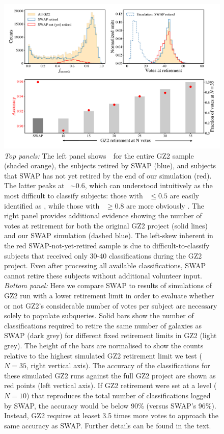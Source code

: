 \begin{figure}
\includegraphics[width=\linewidth]{Figures/human_machine/f6.pdf}
\caption[SWAP's intelligent retirement mechanism 3.5 times fewer classifications than GZ2.]{\textit{Top panels:} The left panel shows~\fsmooth~for the entire GZ2 sample (shaded orange), the subjects retired by SWAP (blue), and subjects that SWAP has not yet retired by the end of our simulation (red). The latter peaks at \fsmooth~$\sim 0.6$, which can understood intuitively as the most difficult to classify subjects: those with \fsmooth~$\le 0.5$ are easily identified as \feat, while those with \fsmooth~$\ge 0.8$ are more obviously \notfeat. The right panel provides additional evidence showing the number of votes at retirement for both the original GZ2 project (solid lines) and our SWAP simulation (dashed blue). The left-skew inherent in the red SWAP-not-yet-retired sample is due to difficult-to-classify subjects that received only 30-40 classifications during the GZ2 project. Even after processing all available classifications, SWAP cannot retire these subjects without additional volunteer input. 
\textit{Bottom panel:} Here we compare SWAP to results of simulations of GZ2 run with a lower retirement limit in order to evaluate whether or not GZ2's considerable number of votes per subject are necessary solely to populate subqueries. Solid bars show the number of classifications required to retire the same number of galaxies as SWAP (dark grey) for different fixed retirement limits in GZ2 (light grey). The height of the bars are normalised to show the counts relative to the highest simulated GZ2 retirement limit we test ($N=35$, right vertical axis).  The accuracy of the classifications for these simulated GZ2 runs against the full GZ2 project are shown as red points (left vertical axis). If GZ2 retirement were set at a level ($N=10$) that reproduces the total number of classifications logged by SWAP, the accuracy would be below 90\% (versus SWAP's 96\%).  Instead, GZ2 requires at leaset 3.5 times more votes to approach the same accuracy as SWAP. Further details can be found in the text.}
\label{fig: gz2 min retirement}
\end{figure}

